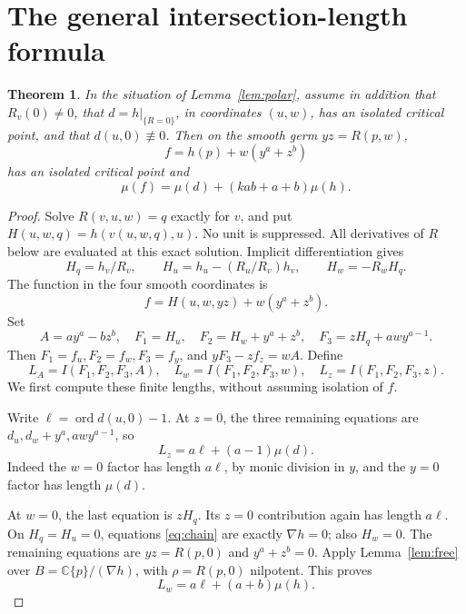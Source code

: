 \documentclass[11pt]{article}
\newtheorem{theorem}{Theorem}
\newcommand{\C}{\mathbb C}
\newcommand{\ord}{\operatorname{ord}}
\begin{document}
\section{The general intersection-length formula}

\begin{theorem}\label{thm:general}
In the situation of Lemma~\ref{lem:polar}, assume in addition that
\(R_v(0)\ne0\), that \(d=h|_{\{R=0\}}\), in coordinates \((u,w)\),
has an isolated critical point, and that \(d(u,0)\not\equiv0\).
Then on the smooth germ \(yz=R(p,w)\),
\[
 f=h(p)+w(y^a+z^b)
\]
has an isolated critical point and
\[
 \mu(f)=\mu(d)+(kab+a+b)\mu(h).
\]
\end{theorem}
\begin{proof}
Solve \(R(v,u,w)=q\) exactly for \(v\), and put
\(H(u,w,q)=h(v(u,w,q),u)\).  No unit is suppressed.
All derivatives of \(R\) below are evaluated at this exact solution.
Implicit differentiation gives
\begin{equation}\label{eq:chain}
 H_q=h_v/R_v,\qquad
 H_u=h_u-(R_u/R_v)h_v,\qquad
 H_w=-R_wH_q.
\end{equation}
The function in the four smooth coordinates is
\[
 f=H(u,w,yz)+w(y^a+z^b).
\]
Set
\[
 A=ay^a-bz^b,\quad
 F_1=H_u,\quad F_2=H_w+y^a+z^b,\quad
 F_3=zH_q+aw y^{a-1}.
\]
Then \(F_1=f_u,F_2=f_w,F_3=f_y\), and
\(yF_3-zf_z=wA\).  Define
\[
 L_A=I(F_1,F_2,F_3,A),\quad
 L_w=I(F_1,F_2,F_3,w),\quad
 L_z=I(F_1,F_2,F_3,z).
\]
We first compute these finite lengths, without assuming isolation
of \(f\).

Write \(\ell=\ord d(u,0)-1\).  At \(z=0\), the three remaining
equations are \(d_u,d_w+y^a,aw y^{a-1}\), so
\begin{equation}\label{eq:Lz}
 L_z=a\ell+(a-1)\mu(d).
\end{equation}
Indeed the \(w=0\) factor has length \(a\ell\), by monic
division in \(y\), and the \(y=0\) factor has length \(\mu(d)\).

At \(w=0\), the last equation is \(zH_q\).
Its \(z=0\) contribution again has length \(a\ell\).
On \(H_q=H_u=0\), equations \eqref{eq:chain} are exactly
\(\nabla h=0\); also \(H_w=0\).  The remaining equations are
\(yz=R(p,0)\) and \(y^a+z^b=0\).
Apply Lemma~\ref{lem:free} over
\(B=\C\{p\}/(\nabla h)\), with \(\rho=R(p,0)\) nilpotent.
This proves
\begin{equation}\label{eq:Lw}
 L_w=a\ell+(a+b)\mu(h).
\end{equation}


\end{proof}
\end{document}
